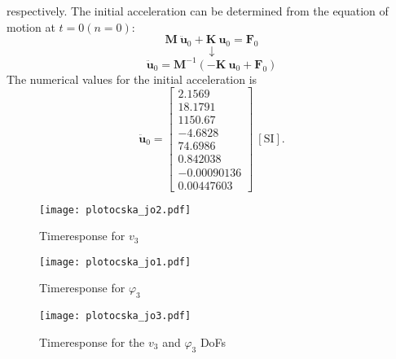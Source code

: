 \documentclass[12pt]{article}
\begin{document}
respectively. The initial acceleration can be determined from the equation of motion at $t = 0 (n = 0)$:
\begin{equation}
\textbf{M} ~ \ddot{\textbf{u}}_0 + \textbf{K} ~ \textbf{u}_0 = \textbf{F}_0
\end{equation}
$$ \downarrow $$
\begin{equation}
\ddot{\textbf{u}}_0 = \textbf{M}^{-1} \left( -\textbf{K} ~ \textbf{u}_0 + \textbf{F}_0 \right)
\end{equation}
The numerical values for the initial acceleration is
\begin{equation}
\ddot{\textbf{u}}_0 = \begin{bmatrix}
2.1569\\
18.1791\\
1150.67\\
-4.6828 \\
74.6986\\
0.842038\\
-0.00090136\\
0.00447603
\end{bmatrix} ~ [\text{SI}].
\end{equation}

\begin{figure}[H]
\centering
    \texttt{[image: plotocska\_jo2.pdf]}
    \caption{Timeresponse for $v_3$}
    \label{fig:plot1}
\end{figure}

\begin{figure}[H]
\centering
    \texttt{[image: plotocska\_jo1.pdf]}
    \caption{Timeresponse for $\varphi_3$}
    \label{fig:plot2}
  \label{fig:combined}
\end{figure}

\begin{figure}[H]
\centering
\texttt{[image: plotocska\_jo3.pdf]}
\caption{Timeresponse for the $v_3$ and $\varphi_3$ DoFs}
\end{figure}
\end{document}
